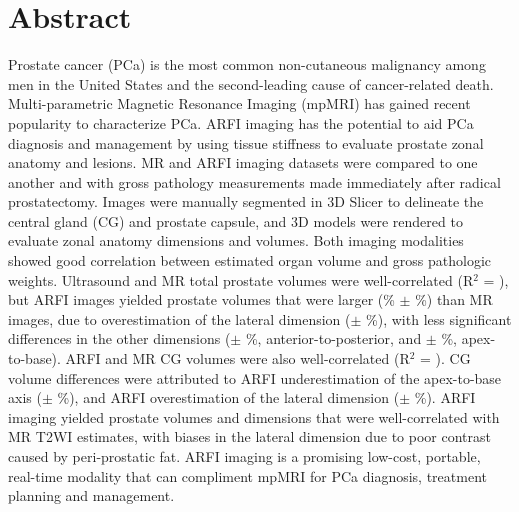 \section*{Abstract}
Prostate cancer (PCa) is the most common non-cutaneous malignancy among men in
the United States and the second-leading cause of cancer-related death.
Multi-parametric Magnetic Resonance Imaging (mpMRI) has gained recent
popularity to characterize PCa.  ARFI imaging has the potential to aid PCa
diagnosis and management by using tissue stiffness to evaluate prostate zonal
anatomy and lesions.  MR and ARFI \invivo imaging datasets were compared to one
another and with gross pathology measurements made immediately after radical
prostatectomy.  Images were manually segmented in 3D Slicer to delineate the
central gland (CG) and prostate capsule, and 3D models were rendered to
evaluate zonal anatomy dimensions and volumes.  Both imaging modalities showed
good correlation between estimated organ volume and gross pathologic weights.
Ultrasound and MR total prostate volumes were well-correlated (R$^2$ =
\MRarfiVolTotalRsq), but ARFI images yielded prostate volumes that were larger
(\MRarfiVolTotalMeanDiff\% $\pm$ \MRarfiVolTotalStdDiff\%) than MR images, due
to overestimation of the lateral dimension (\ARFImrTotalLatLatMeanPct $\pm$
\ARFImrTotalLatLatStdPct\%), with less significant differences in the other
dimensions (\ARFImrTotalAntPostMeanPct $\pm$ \ARFImrTotalAntPostStdPct\%,
anterior-to-posterior, and \ARFImrTotalApexBaseMeanPct $\pm$
\ARFImrTotalApexBaseStdPct\%, apex-to-base).  ARFI and MR CG volumes were also
well-correlated (R$^2$ = \MRarfiVolCentralRsq).  CG volume differences were
attributed to ARFI underestimation of the apex-to-base axis
(\ARFImrCentralApexBaseMeanPct $\pm$ \ARFImrCentralApexBaseStdPct\%), and ARFI
overestimation of the lateral dimension (\ARFImrCentralLatLatMeanPct $\pm$
\ARFImrCentralLatLatStdPct\%).  ARFI imaging yielded prostate volumes and
dimensions that were well-correlated with MR T2WI estimates, with biases in the
lateral dimension due to poor contrast caused by peri-prostatic fat.  ARFI
imaging is a promising low-cost, portable, real-time modality that can
compliment mpMRI for PCa diagnosis, treatment planning and management.
